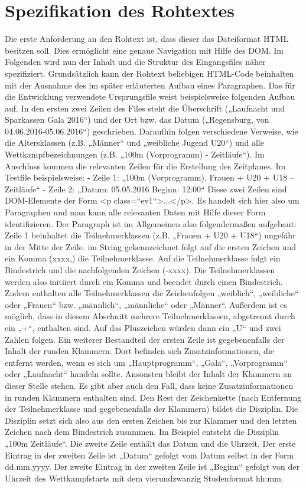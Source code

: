 \section{Spezifikation des Rohtextes}
Die erste Anforderung an den Rohtext ist, dass dieser das Dateiformat HTML besitzen soll. Dies ermöglicht eine genaue Navigation mit Hilfe des \ac{DOM}. Im Folgenden wird nun der Inhalt und die Struktur des Eingangsfiles näher spezifiziert. Grundsätzlich kann der Rohtext beliebigen HTML-Code beinhalten mit der Ausnahme des im später erläuterten Aufbau eines Paragraphen. 
Das für die Entwicklung verwendete Ursprungsfile weist beispielsweise folgenden Aufbau auf. In den ersten zwei Zeilen des Files steht die Überschrift („Laufnacht und Sparkassen Gala 2016“) und der Ort bzw. das Datum („Regensburg, von 04.06.2016-05.06.2016“) geschrieben. Daraufhin folgen verschiedene Verweise, wie die Altersklassen (z.B. „Männer“ und „weibliche Jugend U20“) und alle Wettkampfbezeichnungen (z.B. „100m (Vorprogramm) - Zeitläufe“). Im Anschluss kommen die relevanten Zeilen für die Erstellung des Zeitplanes.
Im Testfile beispielsweise:
-	Zeile 1: „100m (Vorprogramm), Frauen + U20 + U18 – Zeitläufe“
-	Zeile 2: „Datum: 05.05.2016 Beginn: 12:00“
Diese zwei Zeilen sind DOM-Elemente der Form <p class=“ev1“>...</p>. Es handelt sich hier also um Paragraphen und man kann alle relevanten Daten mit Hilfe dieser Form identifizieren.
Der Paragraph ist im Allgemeinen also folgendermaßen aufgebaut:
Zeile 1 beinhaltet die Teilnehmerklassen (z.B. „Frauen + U20 + U18“) ungefähr in der Mitte der Zeile. im String gekennzeichnet folgt auf die ersten Zeichen und ein Komma (xxxx,) die Teilnehmerklasse. Auf die Teilnehmerklasse folgt ein Bindestrich und die nachfolgenden Zeichen (-xxxx). Die Teilnehmerklassen werden also initiiert durch ein Komma und beendet durch einen Bindestrich. Zudem enthalten alle Teilnehmerklassen die Zeichenfolgen „weiblich“, „weibliche“ oder „Frauen“ bzw. „männlich“, „männliche“ oder „Männer“. Außerdem ist es möglich, dass in diesem Abschnitt mehrere Teilnehmerklassen, abgetrennt durch ein „+“, enthalten sind. Auf das Pluszeichen würden dann ein „U“ und zwei Zahlen folgen. Ein weiterer Bestandteil der ersten Zeile ist gegebenenfalls der Inhalt der runden Klammern. Dort befinden sich Zusatzinformationen, die entfernt werden, wenn es sich um „Hauptprogramm“, „Gala“, „Vorprogramm“ oder „Laufnacht“ handeln sollte. Ansonsten bleibt der Inhalt der Klammern an dieser Stelle stehen. Es gibt aber auch den Fall, dass keine Zusatzinformationen in runden Klammern enthalten sind. Den Rest der Zeichenkette (nach Entfernung der Teilnehmerklasse und gegebenenfalls der Klammern) bildet die Disziplin. Die Disziplin setzt sich also aus den ersten Zeichen bis zur Klammer und den letzten Zeichen nach dem Bindestrich zusammen. Im Beispiel entsteht die Disziplin „100m Zeitläufe“.
Die zweite Zeile enthält das Datum und die Uhrzeit. Der erste Eintrag in der zweiten Zeile ist „Datum“ gefolgt vom Datum selbst in der Form dd.mm.yyyy. Der zweite Eintrag in der zweiten Zeile ist „Beginn“ gefolgt von der Uhrzeit des Wettkampfstarts mit dem vierundzwanzig Studenformat hh:mm.

